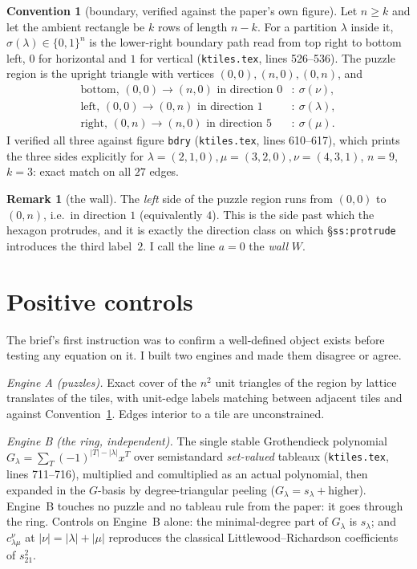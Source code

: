 \documentclass[11pt]{article}
\theoremstyle{definition}
\newtheorem{remark}[theorem]{Remark}
\newtheorem{convention}[theorem]{Convention}
\newcommand{\la}{\lambda}
\newcommand{\cc}{c^{\nu}_{\la\mu}}
\begin{document}
\begin{convention}[boundary, verified against the paper's own figure]\label{conv:bdry}
Let $n\ge k$ and let the ambient rectangle be $k$ rows of length $n-k$. For a
partition $\la$ inside it, $\sigma(\la)\in\{0,1\}^n$ is the lower-right boundary
path read from top right to bottom left, $0$ for horizontal and $1$ for vertical
(\texttt{ktiles.tex}, lines 526--536). The puzzle region is the upright triangle
with vertices $(0,0),(n,0),(0,n)$, and
\[
\begin{aligned}
\text{bottom, } (0,0)\!\to\!(n,0) \text{ in direction } 0 &: \ \sigma(\nu),\\
\text{left, } (0,0)\!\to\!(0,n) \text{ in direction } 1 &: \ \sigma(\la),\\
\text{right, } (0,n)\!\to\!(n,0) \text{ in direction } 5 &: \ \sigma(\mu).
\end{aligned}
\]
I verified all three against figure \texttt{bdry} (\texttt{ktiles.tex}, lines
610--617), which prints the three sides explicitly for
$\la=(2,1,0),\mu=(3,2,0),\nu=(4,3,1)$, $n=9$, $k=3$: exact match on all
$27$ edges.
\end{convention}

\begin{remark}[the wall]\label{rem:wall}
The \emph{left} side of the puzzle region runs from $(0,0)$ to $(0,n)$, i.e.\ in
direction $1$ (equivalently $4$). This is the side past which the hexagon
protrudes, and it is exactly the direction class on which
\S\texttt{ss:protrude} introduces the third label~$2$. I call the line $a=0$
the \emph{wall} $W$.
\end{remark}

\section{Positive controls}\label{sec:controls}

The brief's first instruction was to confirm a well-defined object exists before
testing any equation on it. I built two engines and made them disagree or agree.

\emph{Engine A (puzzles).} Exact cover of the $n^2$ unit triangles of the region
by lattice translates of the tiles, with unit-edge labels matching between
adjacent tiles and against Convention~\ref{conv:bdry}. Edges interior to a tile
are unconstrained.

\emph{Engine B (the ring, independent).} The single stable Grothendieck
polynomial $G_\la=\sum_T(-1)^{|T|-|\la|}x^T$ over semistandard
\emph{set-valued} tableaux (\texttt{ktiles.tex}, lines 711--716), multiplied and
comultiplied as an actual polynomial, then expanded in the $G$-basis by
degree-triangular peeling ($G_\la=s_\la+\text{higher}$). Engine~B touches no
puzzle and no tableau rule from the paper: it goes through the ring. Controls on
Engine~B alone: the minimal-degree part of $G_\la$ is $s_\la$; and $\cc$ at
$|\nu|=|\la|+|\mu|$ reproduces the classical Littlewood--Richardson
coefficients of $s_{21}^2$.
\end{document}
